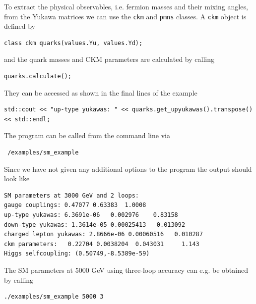 \documentclass[11pt,a4paper]{article}
\begin{document}
To extract the physical observables, i.e. fermion masses and their mixing angles,  from the Yukawa matrices we can use the \texttt{ckm} and \texttt{pmns} classes. A \texttt{ckm} object is defined by
\begin{lstlisting}
class ckm quarks(values.Yu, values.Yd);
\end{lstlisting}
and the quark masses and CKM parameters are calculated by calling
\begin{lstlisting}
quarks.calculate();
\end{lstlisting}
They can be accessed as shown in the final lines of the example
\begin{lstlisting}
std::cout << "up-type yukawas: " << quarks.get_upyukawas().transpose() << std::endl;
  \end{lstlisting}
The program can be called from the command line via
 \begin{lstlisting}
 /examples/sm_example
  \end{lstlisting}
Since we have not given any additional options to the program the output should look like
   \begin{lstlisting}
SM parameters at 3000 GeV and 2 loops:
gauge couplings: 0.47077 0.63383  1.0008
up-type yukawas: 6.3691e-06   0.002976    0.83158
down-type yukawas: 1.3614e-05 0.00025413   0.013092
charged lepton yukawas: 2.8666e-06 0.00060516   0.010287
ckm parameters:   0.22704 0.0038204  0.043031     1.143
Higgs selfcoupling: (0.50749,-8.5389e-59)
   \end{lstlisting}
The SM parameters at 5000 GeV using three-loop accuracy can e.g. be obtained by calling
\begin{lstlisting}
./examples/sm_example 5000 3
  \end{lstlisting}
\end{document}
